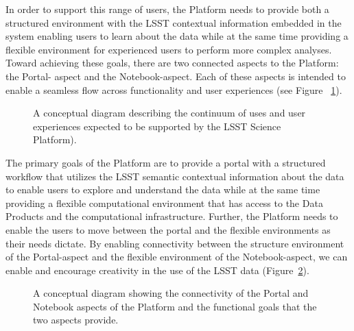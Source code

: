 \documentclass[DM,lsstdraft,toc]{lsstdoc}
\begin{document}
In order to support this range of users, the Platform needs to provide both a 
structured environment with the LSST contextual information embedded in the 
system enabling users to learn about the data while at the same time providing a 
flexible environment for experienced users to perform more complex analyses.  
Toward achieving these goals, there are two connected aspects to the Platform: 
the Portal- aspect and the Notebook-aspect.  Each of these aspects is intended 
to enable a seamless flow across functionality and user experiences (see Figure~
\ref{fig:continuumSP}).
\begin{figure}
\centering
{}
\caption{
A conceptual diagram describing the continuum of uses and user experiences 
expected to be supported by the LSST Science Platform). 
\label{fig:continuumSP}}
\end{figure}

The primary goals of the Platform are to provide a portal with a structured 
workflow that utilizes the LSST semantic contextual information about the data 
to enable users to explore and understand the data while at the same time 
providing a flexible computational environment that has access to the Data 
Products and the computational infrastructure.  Further, the Platform needs to 
enable the users to move between the portal and the flexible environments as 
their needs dictate.  By enabling connectivity between the structure environment 
of the Portal-aspect and the flexible environment of the Notebook-aspect, we can 
enable and encourage creativity in the use of the LSST data 
(Figure~\ref{fig:aspectsSP}).
\begin{figure}
\centering
{}
\caption{
A conceptual diagram showing the connectivity of the Portal and Notebook aspects 
of the Platform and the functional goals that the two aspects provide. 
\label{fig:aspectsSP}}
\end{figure}
\end{document}
